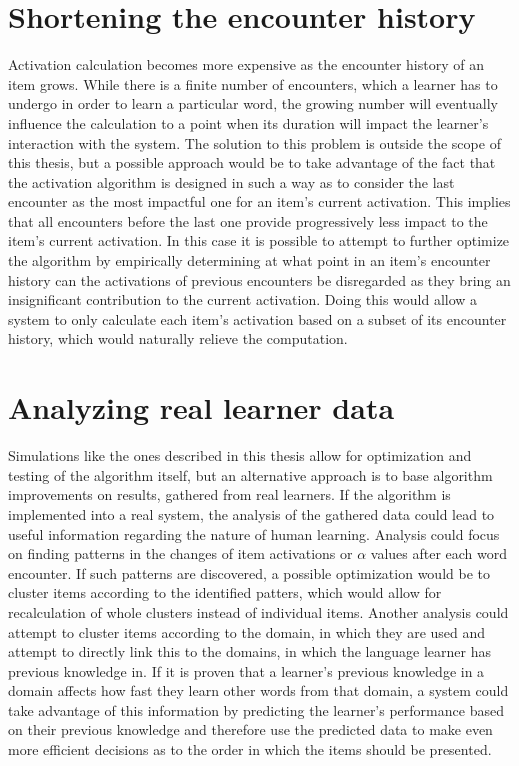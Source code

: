 \documentclass[a4paper]{report}
\begin{document}
\section{Shortening the encounter history}
Activation calculation becomes more expensive as the encounter history of an item grows. While there is a finite number of encounters, which a learner has to undergo in order to learn a particular word, the growing number will eventually influence the calculation to a point when its duration will impact the learner's interaction with the system. The solution to this problem is outside the scope of this thesis, but a possible approach would be to take advantage of the fact that the activation algorithm is designed in such a way as to consider the last encounter as the most impactful one for an item's current activation. This implies that all encounters before the last one provide progressively less impact to the item's current activation. In this case it is possible to attempt to further optimize the algorithm by empirically determining at what point in an item's encounter history can the activations of previous encounters be disregarded as they bring an insignificant contribution to the current activation. Doing this would allow a system to only calculate each item's activation based on a subset of its encounter history, which would naturally relieve the computation.

\section{Analyzing real learner data}
Simulations like the ones described in this thesis allow for optimization and testing of the algorithm itself, but an alternative approach is to base algorithm improvements on results, gathered from real learners. If the algorithm is implemented into a real system, the analysis of the gathered data could lead to useful information regarding the nature of human learning. Analysis could focus on finding patterns in the changes of item activations or $\alpha$ values after each word encounter. If such patterns are discovered, a possible optimization would be to cluster items according to the identified patters, which would allow for recalculation of whole clusters instead of individual items. Another analysis could attempt to cluster items according to the domain, in which they are used and attempt to directly link this to the domains, in which the language learner has previous knowledge in. If it is proven that a learner's previous knowledge in a domain affects how fast they learn other words from that domain, a system could take advantage of this information by predicting the learner's performance based on their previous knowledge and therefore use the predicted data to make even more efficient decisions as to the order in which the items should be presented.
\end{document}
